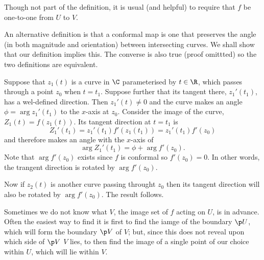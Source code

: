 \documentclass[a4paper]{article}
\begin{document}
Though not part of the definition, it is usual (and helpful) to require that \(f\) be one-to-one from \(U\) to \(V\).

An alternative definition is that a conformal map is one that preserves the angle (in both magnitude and orientation) between intersecting curves. We shall show that our definition implies this. The converse is also true (proof omittted) so the two definitions are equivalent.

Suppose that \(z_1(t)\) is a curve in \(\C\) parameterised by \(t \in \R\), which passes through a point \(z_0\) when \(t = t_1\). Suppose further that its tangent there, \(z_1'(t_1)\), has a wel-defined direction. Then \(z_1'(t) \neq 0\) and the curve makes an angle \(\phi = \arg z_1'(t_1)\) to the \(x\)-axis at \(z_0\). Consider the image of the curve, \(Z_1(t) = f(z_1(t))\). Its tangent direction at \(t = t_1\) is
\[
  Z_1'(t_1) = z_1'(t_1)f'(z_1(t_1)) = z_1'(t_1)f'(z_0)
\]
and therefore makes an angle with the \(x\)-axis of
\[
  \arg Z_1'(t_1) = \phi + \arg f'(z_0).
\]
Note that \(\arg f'(z_0)\) exists since \(f\) is conformal so \(f'(z_0) = 0\). In other words, the trangent direction is rotated by \(\arg f'(z_0)\).

Now if \(z_2(t)\) is another curve passing throught \(z_0\) then its tangent direction will also be rotated by \(\arg f'(z_0)\). The result follows.

Sometimes we do not know what \(V\), the image set of \(f\) acting on  \(U\), is in advance. Often the easiest way to find it is first to find the iamge of the boundary \(\p U\), which will form the boundary \(\p V\) of \(V\); but, since this does not reveal upon which side of \(\p V\) \(V\) lies, to then find the image of a single point of our choice within \(U\), which will lie within \(V\).
\end{document}
